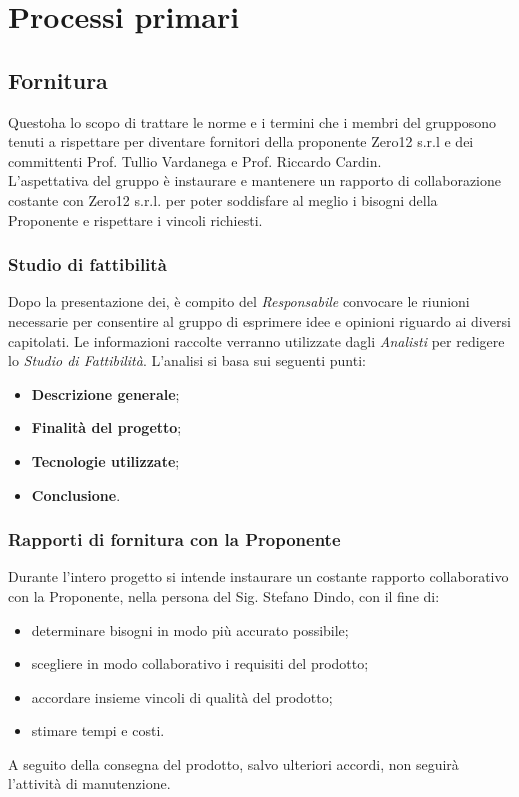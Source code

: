\chapter{Processi primari}
\section{Fornitura}			
Questoha lo scopo di trattare le norme e i termini che i membri del grupposono tenuti a rispettare per diventare fornitori della proponente Zero12 s.r.l e dei committenti Prof. Tullio Vardanega e Prof. Riccardo Cardin. \\
L'aspettativa del gruppo è instaurare e mantenere un rapporto di collaborazione costante con Zero12 s.r.l. per poter soddisfare al meglio i bisogni della Proponente e rispettare i vincoli richiesti.
\subsection{Studio di fattibilità} 
Dopo la presentazione dei, è compito del \textit{Responsabile} convocare le riunioni necessarie per consentire al gruppo di esprimere idee e opinioni riguardo ai diversi capitolati. Le informazioni raccolte verranno utilizzate dagli \textit{Analisti} per redigere lo \textit{Studio di Fattibilità}. L'analisi si basa sui seguenti punti:
\begin{itemize}
	\item \textbf{Descrizione generale};
	\item \textbf{Finalità del progetto};
	\item \textbf{Tecnologie utilizzate};
	\item \textbf{Conclusione}.
\end{itemize}
\subsection{Rapporti di fornitura con la Proponente}
Durante l'intero progetto si intende instaurare un costante rapporto collaborativo con la Proponente, nella persona del Sig. Stefano Dindo, con il fine di:
\begin{itemize}
	\item determinare bisogni in modo più accurato possibile;
	\item scegliere in modo collaborativo i requisiti del prodotto;
	\item accordare insieme vincoli di qualità del prodotto;
	\item stimare tempi e costi.
\end{itemize}
A seguito della consegna del prodotto, salvo ulteriori accordi, non seguirà l'attività di manutenzione.

